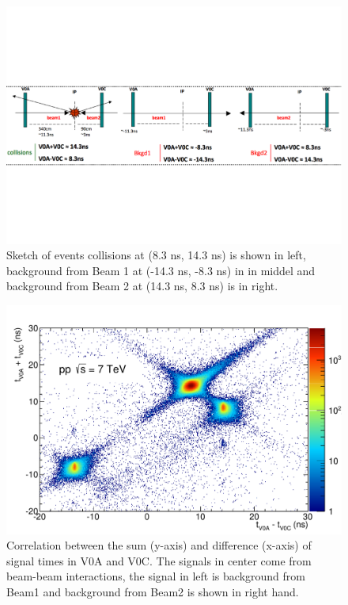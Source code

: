 \begin{figure}[htbp]
\begin{center}
\includegraphics[width=14.cm]{./Version1/FigChapter4/V0time}
\caption{Sketch of events collisions at (8.3 ns, 14.3 ns) is shown in left, background from Beam 1 at (-14.3 ns, -8.3 ns) in in middel and background from Beam 2 at (14.3 ns, 8.3 ns) is in right.}
\label{fig:v0time}
\end{center}
\end{figure}

\begin{figure}[htbp]
\begin{center}
\includegraphics[width=10.cm]{./Version1/FigChapter4/FigureV0}
\caption{Correlation between the sum (y-axis) and difference (x-axis) of signal times in V0A and V0C. The signals in center come from beam-beam interactions, the signal in left is background from Beam1 and background from Beam2 is shown in right hand.}
\label{fig:v0}
\end{center}
\end{figure}



